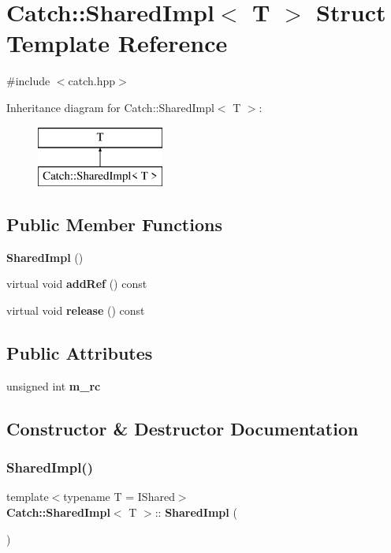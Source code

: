 \section{Catch\+:\+:Shared\+Impl$<$ T $>$ Struct Template Reference}
\label{struct_catch_1_1_shared_impl}


{\ttfamily \#include $<$catch.\+hpp$>$}

Inheritance diagram for Catch\+:\+:Shared\+Impl$<$ T $>$\+:\begin{figure}[H]
\begin{center}
\leavevmode
\includegraphics[height=2.000000cm]{struct_catch_1_1_shared_impl}
\end{center}
\end{figure}
\subsection*{Public Member Functions}
\begin{DoxyCompactItemize}
\item 
\textbf{ Shared\+Impl} ()
\item 
virtual void \textbf{ add\+Ref} () const
\item 
virtual void \textbf{ release} () const
\end{DoxyCompactItemize}
\subsection*{Public Attributes}
\begin{DoxyCompactItemize}
\item 
unsigned int \textbf{ m\+\_\+rc}
\end{DoxyCompactItemize}


\subsection{Constructor \& Destructor Documentation}
\mbox{\label{struct_catch_1_1_shared_impl_a0629856ee353298b61ad52cf60e716fb}} 
\subsubsection{Shared\+Impl()}
{\footnotesize\ttfamily template$<$typename T = I\+Shared$>$ \\
\textbf{ Catch\+::\+Shared\+Impl}$<$ T $>$\+::\textbf{ Shared\+Impl} (\begin{DoxyParamCaption}{ }\end{DoxyParamCaption})\hspace{0.3cm}{\ttfamily [inline]}}



